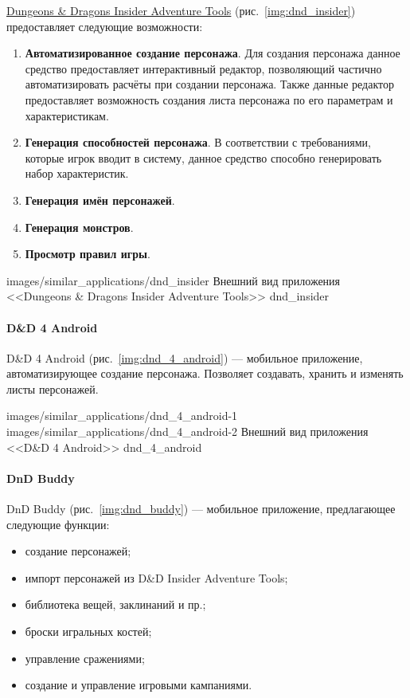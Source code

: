 \href{http://www.wizards.com/dnd/Tool.aspx?x=dnd/4new/tool/adventuretools}{Dungeons \& Dragons Insider Adventure Tools} (рис.~\ref{img:dnd_insider}) предоставляет следующие возможности:
\begin{enumerate}
\item \textbf{Автоматизированное создание персонажа}. Для создания персонажа данное средство предоставляет интерактивный редактор, позволяющий частично автоматизировать расчёты при создании персонажа. Также данные редактор предоставляет возможность создания листа персонажа по его параметрам и характеристикам.
\item \textbf{Генерация способностей персонажа}. В соответствии с требованиями, которые игрок вводит в систему, данное средство способно генерировать набор характеристик.
\item \textbf{Генерация имён персонажей}.
\item \textbf{Генерация монстров}.
\item \textbf{Просмотр правил игры}.
\end{enumerate}

            {images/similar_applications/dnd_insider}
            {Внешний вид приложения <<Dungeons \& Dragons Insider Adventure Tools>>}
            {dnd_insider}



\paragraph{D\&D 4 Android}
D\&D 4 Android (рис.~\ref{img:dnd_4_android}) --- мобильное приложение, автоматизирующее создание персонажа. Позволяет создавать, хранить и изменять листы персонажей.

               {images/similar_applications/dnd_4_android-1}
               {images/similar_applications/dnd_4_android-2}
               {Внешний вид приложения <<D\&D 4 Android>>}
               {dnd_4_android}


\paragraph{DnD Buddy}
DnD Buddy (рис.~\ref{img:dnd_buddy}) --- мобильное приложение, предлагающее следующие функции:
\begin{itemize}
\item создание персонажей;
\item импорт персонажей из D\&D Insider Adventure Tools;
\item библиотека вещей, заклинаний и пр.;
\item броски игральных костей;
\item управление сражениями;
\item создание и управление игровыми кампаниями.
\end{itemize}


